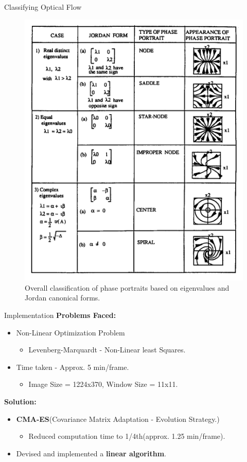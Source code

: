 \documentclass{beamer}
\begin{document}
\begin{frame}{Classifying Optical Flow}




            \begin{figure}[h]
            	\centering
            	\includegraphics[width =  0.4\linewidth]{images/ph_classification_1.png} 
            	\caption{Overall classification of phase portraits based on eigenvalues and Jordan canonical forms. \cite{phase_port_paper}}
            	\label{phase_port_class}
            \end{figure}

\end{frame}


\begin{frame}{Implementation }
\textbf{Problems Faced:}
\begin{itemize}
\item Non-Linear Optimization Problem
\begin{itemize}
\item Levenberg-Marquardt - Non-Linear least Squares.
\end{itemize}
\item Time taken - Approx. 5 min/frame.
\begin{itemize}
\item Image Size = 1224x370, Window Size = 11x11.
\end{itemize}
\end{itemize}

\textbf{Solution:}
\begin{itemize}
\item \textbf{CMA-ES}(Covariance Matrix Adaptation - Evolution Strategy.)
\begin{itemize}
\item Reduced computation time to 1/4th(approx. 1.25 min/frame).
\end{itemize}
\item Devised and implemented a \textbf{linear algorithm}.
\end{itemize}
\end{frame}
\end{document}
